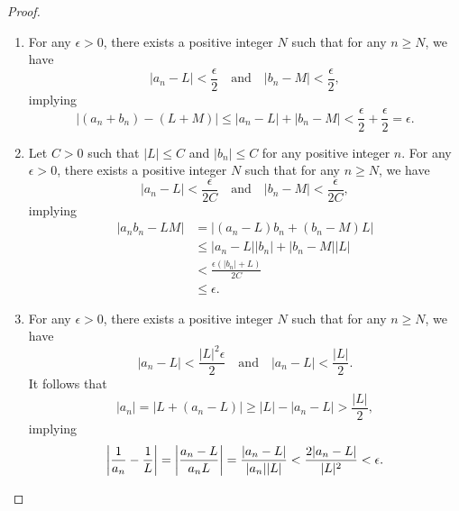 \begin{proof}
  \leavevmode
  \begin{enumerate}
    \item For any $\epsilon > 0$, there exists a positive integer $N$ such that
    for any $n \geq N$, we have
    \begin{equation*}
      |a_n - L| < \frac{\epsilon}{2}
      \quad \text{and} \quad
      |b_n - M| < \frac{\epsilon}{2},
    \end{equation*}
    implying
    \begin{equation*}
      |(a_n + b_n) - (L + M)|
      \leq |a_n - L| + |b_n - M|
      < \frac{\epsilon}{2} + \frac{\epsilon}{2}
      = \epsilon.
    \end{equation*}
    
    \item Let $C > 0$ such that $|L| \leq C$ and $|b_n| \leq C$ for any
    positive integer $n$.
    For any $\epsilon > 0$, there exists a positive integer $N$ such that for
    any $n \geq N$, we have
    \begin{equation*}
      |a_n - L| < \frac{\epsilon}{2C}
      \quad \text{and} \quad
      |b_n - M| < \frac{\epsilon}{2C},
    \end{equation*}
    implying
    \begin{align*}
      |a_nb_n - LM|
      &= |(a_n - L)b_n + (b_n - M)L| \\
      &\leq |a_n - L||b_n| + |b_n - M||L| \\
      &< \frac{\epsilon (|b_n| + L)}{2C} \\
      &\leq \epsilon.
    \end{align*}
  
    \item For any $\epsilon > 0$, there exists a positive integer $N$ such that
    for any $n \geq N$, we have
    \begin{equation*}
      |a_n - L| < \frac{|L|^2\epsilon}{2}
      \quad \text{and} \quad
      |a_n - L| < \frac{|L|}{2}.
    \end{equation*}
    It follows that
    \begin{equation*}
      |a_n|
      = |L + (a_n - L)|
      \geq |L| - |a_n - L|
      > \frac{|L|}{2},
    \end{equation*}
    implying
    \begin{equation*}
      \left|\frac{1}{a_n} - \frac{1}{L}\right|
      = \left|\frac{a_n - L}{a_nL}\right|
      = \frac{|a_n - L|}{|a_n||L|}
      < \frac{2|a_n - L|}{|L|^2}
      < \epsilon.
      \qedhere
    \end{equation*}
  \end{enumerate}
\end{proof}